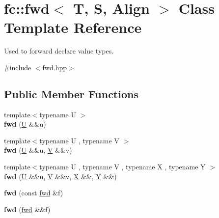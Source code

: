 \hypertarget{classfc_1_1fwd}{}\section{fc\+:\+:fwd$<$ T, S, Align $>$ Class Template Reference}
\label{classfc_1_1fwd}


Used to forward declare value types.  




{\ttfamily \#include $<$fwd.\+hpp$>$}

\subsection*{Public Member Functions}
\begin{DoxyCompactItemize}
\item 
\mbox{\label{classfc_1_1fwd_ab9d81fb9b9effc4085c706922cb6b478}} 
{\footnotesize template$<$typename U $>$ }\\{\bfseries fwd} (\mbox{\hyperlink{union_u}{U}} \&\&u)
\item 
\mbox{\label{classfc_1_1fwd_a580dd3c3e504801fbe069aee1c2fb4ad}} 
{\footnotesize template$<$typename U , typename V $>$ }\\{\bfseries fwd} (\mbox{\hyperlink{union_u}{U}} \&\&u, \mbox{\hyperlink{struct_v}{V}} \&\&v)
\item 
\mbox{\label{classfc_1_1fwd_a6a0734e9ecd814f901dbbef049646b5a}} 
{\footnotesize template$<$typename U , typename V , typename X , typename Y $>$ }\\{\bfseries fwd} (\mbox{\hyperlink{union_u}{U}} \&\&u, \mbox{\hyperlink{struct_v}{V}} \&\&v, \mbox{\hyperlink{class_x}{X}} \&\&, \mbox{\hyperlink{struct_y}{Y}} \&\&)
\item 
\mbox{\label{classfc_1_1fwd_a485a231bb037d6567c0aadc6f1261b6a}} 
{\bfseries fwd} (const \mbox{\hyperlink{classfc_1_1fwd}{fwd}} \&f)
\item 
\mbox{\label{classfc_1_1fwd_ab5e2dbf6b924958ed42369ebcdff9418}} 
{\bfseries fwd} (\mbox{\hyperlink{classfc_1_1fwd}{fwd}} \&\&f)
\item 
\mbox{\label{classfc_1_1fwd_a1ed02450b92795421332c41207b291ce}} 

\end{DoxyCompactItemize}
